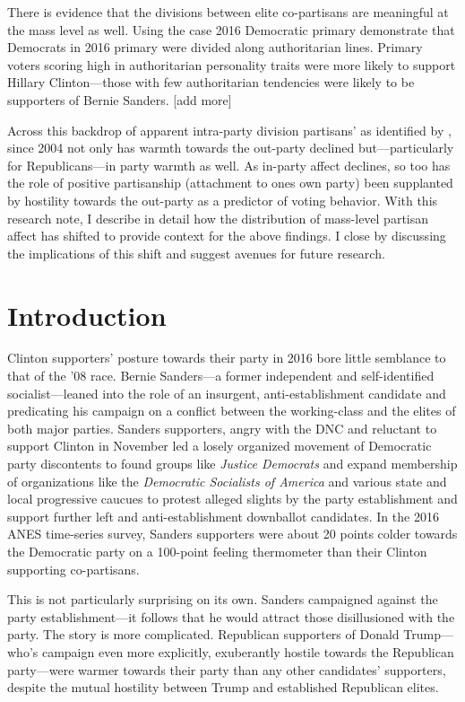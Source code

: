 \documentclass[12pt]{paper}
\begin{document}
There is evidence that the divisions between elite co-partisans are meaningful at the mass level as well. Using the case 2016 Democratic primary \cite{wronski2018tale} demonstrate that Democrats in 2016 primary were divided along authoritarian lines. Primary voters scoring high in authoritarian personality traits were more likely to support Hillary Clinton---those with few authoritarian tendencies were likely to be supporters of Bernie Sanders. [add more]

Across this backdrop of apparent intra-party division partisans' as identified by \cite{klar2018affective}, since 2004 not only has warmth towards the out-party declined but---particularly for Republicans---in party warmth as well. As in-party affect declines, so too has the role of positive partisanship (attachment to ones own party) been supplanted by hostility towards the out-party as a predictor of voting behavior\cite{iyengar2018strengthening}. With this research note, I describe in detail how the distribution of mass-level partisan affect has shifted to provide context for the above findings. I close by discussing the implications of this shift and suggest avenues for future research.

\section{Introduction}



Clinton supporters' posture towards their party in 2016 bore little semblance to that of the '08 race. Bernie Sanders---a former independent and self-identified socialist---leaned into the role of an insurgent, anti-establishment candidate and predicating his campaign on a conflict between the working-class and the elites of both major parties. Sanders supporters, angry with the DNC and reluctant to support Clinton in November led a losely organized movement of Democratic party discontents to found groups like \textit{Justice Democrats} and expand membership of organizations like the \textit{Democratic Socialists of America} and various state and local progressive caucues to protest alleged slights by the party establishment and support further left and anti-establishment downballot candidates. In the 2016 ANES time-series survey, Sanders supporters were about 20 points colder towards the Democratic party on a 100-point feeling thermometer than their Clinton supporting co-partisans.

This is not particularly surprising on its own. Sanders campaigned against the party establishment---it follows that he would attract those disillusioned with the party. The story is more complicated. Republican supporters of Donald Trump---who's campaign even more explicitly, exuberantly hostile towards the Republican party---were warmer towards their party than any other candidates' supporters, despite the mutual hostility between Trump and established Republican elites.
\end{document}
